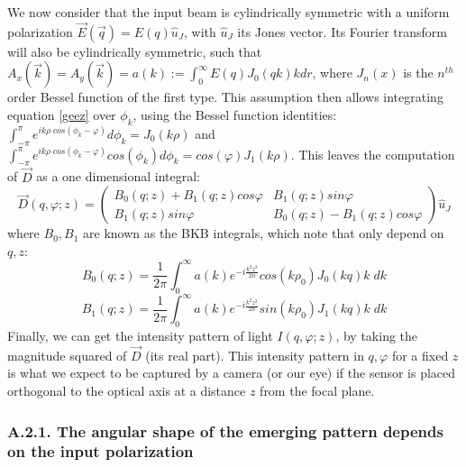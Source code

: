 \documentclass[11pt, a4paper, twoside]{article} %
\begin{document}
We now consider that the input beam is cylindrically symmetric with a uniform polarization $\vec{E}(\vec{q})=E(q)\hat{u}_J$, with $\hat{u}_J$ its Jones vector. Its Fourier transform will also be cylindrically symmetric, such that $A_x(\vec{k})=A_y(\vec{k})=a(k):=\int_0^\infty E(q)J_0(qk)k dr$, where $J_n(x)$ is the $n^{th}$ order Bessel function of the first type. This assumption then allows integrating equation \eqref{geez}
over $\phi_k$, using the Bessel function identities: $\int_{-\pi}^{\pi}e^{ik\rho\;cos(\phi_k-\varphi)}d\phi_k=J_0(k\rho)$ and $\int_{-\pi}^{\pi}e^{ik\rho\;cos(\phi_k-\varphi)}cos(\phi_k)d\phi_k=cos(\varphi)J_1(k\rho)$. This leaves the computation of $\vec{D}$ as a one dimensional integral:
\begin{equation}\label{master}
\vec{D}(q, \varphi;z)=\begin{pmatrix}
B_0(q;z)+B_1(q;z)cos\varphi & B_1(q;z) sin\varphi\\
B_1(q;z)sin\varphi & B_0(q;z)-B_1(q;z)cos\varphi
\end{pmatrix}\hat{u}_J
\end{equation}
where $B_0,B_1$ are known as the BKB integrals, which note that only depend on $q,z$:
\begin{equation}\label{bkb1}
B_0(q;z)=\frac{1}{2\pi}\int_0^\infty a(k)e^{-i\frac{k^2z^2}{2n}}cos(k\rho_0)J_0(kq)k\;dk
\end{equation}
\begin{equation}\label{bkb2}
B_1(q;z)=\frac{1}{2\pi}\int_0^\infty a(k)e^{-i\frac{k^2z^2}{2n}}sin(k\rho_0)J_1(kq)k\;dk
\end{equation}
Finally, we can get the intensity pattern of light $I(q,\varphi;z)$, by taking the magnitude squared of $\vec{D}$ (its real part). This intensity pattern in $q,\varphi$ for a fixed $z$ is what we expect to be captured by a camera (or our eye) if the sensor is placed orthogonal to the optical axis at a distance $z$ from the focal plane.

\subsubsection*{A.2.1. The angular shape of the emerging pattern depends on the input polarization}
\end{document}
